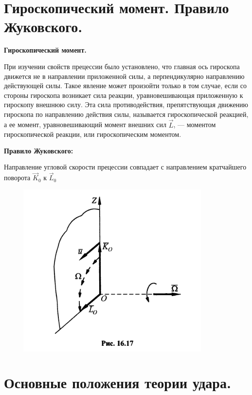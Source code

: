 {\begin{center}
\end{center}
\section{Гироскопический момент. Правило Жуковского.}
\begin{center}
    \par \textbf{Гироскопический момент.}
    
    \par При изучении свойств прецессии было установлено, что главная ось гироскопа движется не в направлении приложенной силы, а перпендикулярно направлению действующей силы. Такое явление может произойти только в том случае, если со стороны гироскопа возникает сила реакции, уравновешивающая приложенную к гироскопу внешнюю силу. Эта сила противодействия, препятствующая движению гироскопа по направлению действия силы, называется гироскопической реакцией, а ее момент, уравновешивающий момент внешних сил $\vec{L}$, — моментом гироскопической реакции, или гироскопическим моментом.
    
    \par \textbf{Правило Жуковского:}
    
    \par Направление угловой скорости прецессии совпадает с направлением кратчайшего поворота $\vec{K}_0$ к  $\vec{L}_0$       
    
    \begin{figure}[H]
        \centering\includegraphics[scale=0.5]{img/16.17.jpeg} 
    \end{figure}

\end{center}
\section{Основные положения теории удара.}

}
